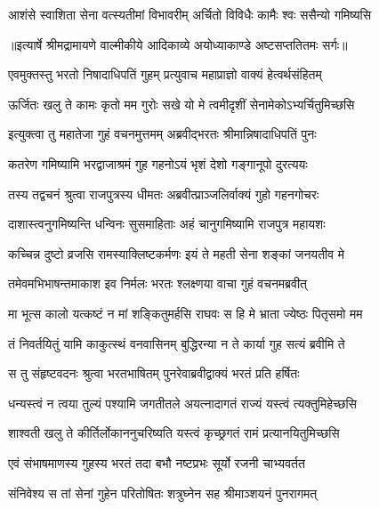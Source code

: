 \twolineshloka
{आशंसे स्वाशिता सेना वत्स्यतीमां विभावरीम्}
{अर्चितो विविधैः कामैः श्वः ससैन्यो गमिष्यसि} %


{॥इत्यार्षे श्रीमद्रामायणे वाल्मीकीये आदिकाव्ये अयोध्याकाण्डे अष्टसप्ततितमः सर्गः॥}


\twolineshloka
{एवमुक्तस्तु भरतो निषादाधिपतिं गुहम्}
{प्रत्युवाच महाप्राज्ञो वाक्यं हेत्वर्थसंहितम्} %

\twolineshloka
{ऊर्जितः खलु ते कामः कृतो मम गुरोः सखे}
{यो मे त्वमीदृशीं सेनामेकोऽभ्यर्चितुमिच्छसि} %

\twolineshloka
{इत्युक्त्वा तु महातेजा गुहं वचनमुत्तमम्}
{अब्रवीद्भरतः श्रीमान्निषादाधिपतिं पुनः} %

\twolineshloka
{कतरेण गमिष्यामि भरद्वाजाश्रमं गुह}
{गहनोऽयं भृशं देशो गङ्गानूपो दुरत्ययः} %

\twolineshloka
{तस्य तद्वचनं श्रुत्वा राजपुत्रस्य धीमतः}
{अब्रवीत्प्राञ्जलिर्वाक्यं गुहो गहनगोचरः} %

\twolineshloka
{दाशास्त्वनुगमिष्यन्ति धन्विनः सुसमाहिताः}
{अहं चानुगमिष्यामि राजपुत्र महायशः} %

\twolineshloka
{कच्चिन्न दुष्टो व्रजसि रामस्याक्लिष्टकर्मणः}
{इयं ते महती सेना शङ्कां जनयतीव मे} %

\twolineshloka
{तमेवमभिभाषन्तमाकाश इव निर्मलः}
{भरतः श्लक्ष्णया वाचा गुहं वचनमब्रवीत्} %

\twolineshloka
{मा भूत्स कालो यत्कष्टं न मां शङ्कितुमर्हसि}
{राघवः स हि मे भ्राता ज्येष्ठः पितृसमो मम} %

\twolineshloka
{तं निवर्तयितुं यामि काकुत्स्थं वनवासिनम्}
{बुद्धिरन्या न ते कार्या गुह सत्यं ब्रवीमि ते} %

\twolineshloka
{स तु संहृष्टवदनः श्रुत्वा भरतभाषितम्}
{पुनरेवाब्रवीद्वाक्यं भरतं प्रति हर्षितः} %

\twolineshloka
{धन्यस्त्वं न त्वया तुल्यं पश्यामि जगतीतले}
{अयत्नादागतं राज्यं यस्त्वं त्यक्तुमिहेच्छसि} %

\twolineshloka
{शाश्वती खलु ते कीर्तिर्लोकाननुचरिष्यति}
{यस्त्वं कृच्छ्रगतं रामं प्रत्यानयितुमिच्छसि} %

\twolineshloka
{एवं संभाषमाणस्य गुहस्य भरतं तदा}
{बभौ नष्टप्रभः सूर्यो रजनी चाभ्यवर्तत} %

\twolineshloka
{संनिवेश्य स तां सेनां गुहेन परितोषितः}
{शत्रुघ्नेन सह श्रीमाञ्शयनं पुनरागमत्} %

